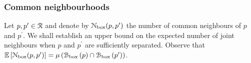 \subsubsection*{Common neighbourhoods}

Let $p, p^\prime \in {\mathcal R}$ and denote by
${\mathcal N}_{\text{box}}(p,p^\prime)$ the number of common neighbours of $p$ and $p^\prime$. We shall establish an upper bound on the expected number of joint neighbours when $p$ and $p^\prime$ are sufficiently separated. Observe that $\mathbb{E}\left[{\mathcal N}_{\text{box}}(p,p^\prime)\right] = \mu\left({\mathcal B}_{\text{box}}\left(p\right) \cap {\mathcal B}_{\text{box}}\left(p^\prime\right)\right)$. 

